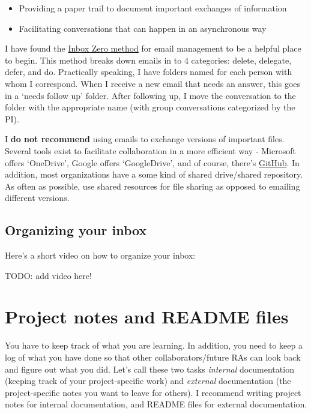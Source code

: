 \documentclass[
]{book}
\begin{document}
\begin{itemize}
\item
  Providing a paper trail to document important exchanges of information
\item
  Facilitating conversations that can happen in an asynchronous way
\end{itemize}

I have found the \href{https://hive.com/blog/inbox-zero/}{Inbox Zero method} for email management to be a helpful place to begin. This method breaks down emails in to 4 categories: delete, delegate, defer, and do. Practically speaking, I have folders named for each person with whom I correspond. When I receive a new email that needs an answer, this goes in a `needs follow up' folder. After following up, I move the conversation to the folder with the appropriate name (with group conversations categorized by the PI).

I \textbf{do not recommend} using emails to exchange versions of important files. Several tools exist to facilitate collaboration in a more efficient way - Microsoft offers `OneDrive', Google offers `GoogleDrive', and of course, there's \href{https://docs.github.com/en/get-started/getting-started-with-git}{GitHub}. In addition, most organizations have a some kind of shared drive/shared repository. As often as possible, use shared resources for file sharing as opposed to emailing different versions.

\hypertarget{organizing-your-inbox}{%
\subsection{Organizing your inbox}\label{organizing-your-inbox}}

Here's a short video on how to organize your inbox:

TODO: add video here!

\hypertarget{project-notes}{%
\section{Project notes and README files}\label{project-notes}}

You have to keep track of what you are learning. In addition, you need to keep a log of what you have done so that other collaborators/future RAs can look back and figure out what you did. Let's call these two tasks \emph{internal} documentation (keeping track of your project-specific work) and \emph{external} documentation (the project-specific notes you want to leave for others). I recommend writing project notes for internal documentation, and README files for external documentation.
\end{document}
